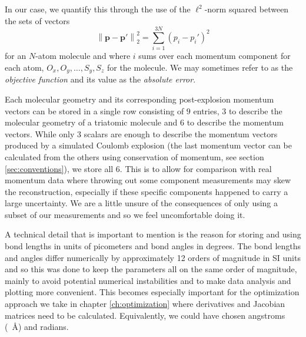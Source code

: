 In our case, we quantify this through the use of the $\ell^2$-norm squared between the sets of vectors
\begin{equation}
\left\|\mathbf{p} - \mathbf{p}'\right\|_2^2
= \sum\limits_{i = 1}^{3N} (p_i - p_i')^2
\end{equation}
for an $N$-atom molecule and where $i$ sums over each momentum component for each atom, \eg $O_x, O_y, \dots, S_y, S_z$ for the  molecule. We may sometimes refer to as the \emph{objective function} and its value as the \emph{absolute error}.


Each molecular geometry and its corresponding post-explosion momentum vectors can be stored in a single row consisting of $9$ entries, $3$ to describe the molecular geometry of a triatomic molecule and $6$ to describe the momentum vectors. While only $3$ scalars are enough to describe the momentum vectors produced by a simulated Coulomb explosion (the last momentum vector can be calculated from the others using conservation of momentum, see section \ref{sec:conventions}), we store all $6$. This is to allow for comparison with real momentum data where throwing out some component measurements may skew the reconstruction, especially if these specific components happened to carry a large uncertainty. We are a little unsure of the consequences of only using a subset of our measurements and so we feel uncomfortable doing it.

A technical detail that is important to mention is the reason for storing and using bond lengths in units of picometers and bond angles in degrees. The bond lengths and angles differ numerically by approximately 12 orders of magnitude in SI units and so this was done to keep the parameters all on the same order of magnitude, mainly to avoid potential numerical instabilities and to make data analysis and plotting more convenient. This becomes especially important for the optimization approach we take in chapter \ref{ch:optimization} where derivatives and Jacobian matrices need to be calculated. Equivalently, we could have chosen angstroms (\SI{}{\angstrom}) and radians.

